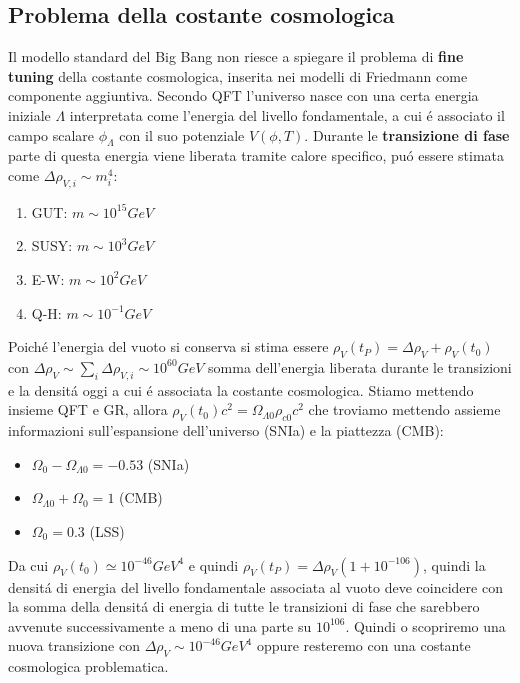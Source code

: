\documentclass[12pt, a4paper]{article}
\begin{document}
\subsection{Problema della costante cosmologica}
Il modello standard del Big Bang non riesce a spiegare il problema di \textbf{fine tuning} della costante cosmologica, inserita nei modelli di Friedmann come componente aggiuntiva. Secondo QFT l'universo nasce con una certa energia iniziale $\Lambda$ interpretata come l'energia del livello fondamentale, a cui \'{e} associato il campo scalare $\phi_{\Lambda}$ con il suo potenziale $V(\phi,T)$. Durante le \textbf{transizione di fase} parte di questa energia viene liberata tramite calore specifico, pu\'{o} essere stimata come $\Delta\rho_{V,i}\sim m_i^4$:
\begin{enumerate}
\item GUT: $m\sim10^{15} GeV$
\item SUSY: $m\sim10^{3} GeV$
\item E-W: $m\sim10^{2} GeV$
\item Q-H: $m\sim10^{-1} GeV$
\end{enumerate}
Poich\'{e} l'energia del vuoto si conserva si stima essere $\rho_V(t_P)= \Delta \rho_V+\rho_V(t_0)$ con  $\Delta\rho_V\sim \sum_i \Delta\rho_{V,i} \sim 10^{60} GeV$ somma dell'energia liberata durante le transizioni e la densit\'{a} oggi a cui \'{e} associata la costante cosmologica. Stiamo mettendo insieme QFT e GR, allora $\rho_V(t_0)c^2=\Omega_{\Lambda0}\rho_{c0}c^2$ che troviamo mettendo assieme informazioni sull'espansione dell'universo (SNIa) e la piattezza (CMB):
\begin{itemize}
\item $\Omega_0-\Omega_{\Lambda0}=-0.53$ (SNIa)
\item $\Omega_{\Lambda0}+\Omega_0=1$ (CMB)
\item $\Omega_0=0.3$ (LSS)
\end{itemize}
Da cui $\rho_V(t_0)\simeq10^{-46} GeV^4$ e quindi $\rho_V(t_P)= \Delta \rho_V(1+ 10^{-106})$, quindi la densit\'{a} di energia del livello fondamentale associata al vuoto deve coincidere con la somma della densit\'{a} di energia di tutte le transizioni di fase che sarebbero avvenute successivamente a meno di una parte su $10^{106}$. Quindi o scopriremo una nuova transizione con $\Delta\rho_{V}\sim 10^{-46} GeV^{4}$ oppure resteremo con una costante cosmologica problematica.
\end{document}
